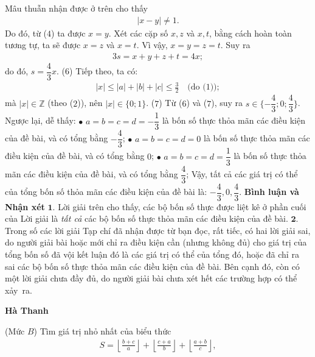 \begin{multicols}{2}
	\vskip 0.05cm
	Mâu thuẫn nhận được ở trên cho thấy
	\begin{align*}
		|x - y| \ne 1.
	\end{align*}
	Do đó, từ ($4$) ta được $x = y$.
	\vskip 0.05cm
	Xét các cặp số $x, z$ và $x, t$, bằng cách hoàn toàn tương tự, ta sẽ được $x = z$ và $x = t$.
	\vskip 0.05cm
	Vì vậy, $x = y = z = t$. Suy ra
	\begin{align*}
		3s = x  + y + z + t = 4x;
	\end{align*}
	do đó, $s = \dfrac{4}{3}x$. \hfill ($6$)
	\vskip 0.05cm
	Tiếp theo, ta có:
	\begin{align*}
		|x| \le |a| + |b| + |c| \le \frac{3}{2} \quad\text{(do ($1$))}; 
	\end{align*}
	mà $|x| \in \mathbb{Z}$  (theo ($2$)), nên  $|x| \in \{0;1\}$. \hfill ($7$)
	\vskip 0.05cm
	Từ ($6$) và ($7$), suy ra $s \in \{-\dfrac{4}{3}; 0; \dfrac{4}{3}\}$.
	\vskip 0.05cm 
	Ngược lại, dễ thấy:
	\vskip 0.05cm
	$\bullet$ $a=b=c=d = -\dfrac{1}{3}$   là bốn số thực thỏa mãn các điều kiện của đề bài, và có tổng bằng $- \dfrac{4}{3}$;
	\vskip 0.05cm  
	$\bullet$  $a=b=c=d = 0$  là bốn số thực thỏa mãn các điều kiện của đề bài, và có tổng bằng $0$;
	\vskip 0.05cm
	$\bullet$ $a=b=c=d = \dfrac{1}{3}$   là bốn số thực thỏa mãn các điều kiện của đề bài, và có tổng bằng $\dfrac{4}{3}$;
	\vskip 0.05cm  
	Vậy, tất cả các giá trị có thể của tổng bốn số thỏa mãn các điều kiện của đề bài là:  $- \dfrac{4}{3}, 0, \dfrac{4}{3}$.
	\vskip 0.05cm  
	\textbf{\color{thachthuctoanhoc}Bình luận và Nhận xét}
	\vskip 0.05cm
	$\pmb{1.}$ Lời giải trên cho thấy, các bộ bốn số thực được liệt kê ở phần cuối của Lời giải là \textit{tất cả} các bộ bốn số thực thỏa mãn các điều kiện của đề bài.
	\vskip 0.05cm
	$\pmb{2.}$ Trong số các lời giải Tạp chí đã nhận được từ bạn đọc, rất tiếc, có hai lời giải sai, do người giải bài hoặc mới chỉ ra điều kiện cần (nhưng không đủ) cho giá trị của tổng bốn số đã vội kết luận đó là các giá trị có thể của tổng đó, hoặc đã chỉ ra sai các bộ bốn số thực thỏa mãn các điều kiện của đề bài. Bên cạnh đó, còn có một lời giải chưa đầy đủ, do người giải bài chưa xét hết các trường hợp có thể xảy~ra.
	\begin{flushright}
		\textbf{\color{thachthuctoanhoc}Hà Thanh}
	\end{flushright}
	{}
	(Mức $B$)
	Tìm giá trị nhỏ nhất của biểu thức
	\begin{align*}
		S = \left\lfloor {\frac{{b + c}}{a}} \right\rfloor  + \left\lfloor {\frac{{c + a}}{b}} \right\rfloor  + \left\lfloor {\frac{{a + b}}{c}} \right\rfloor ,

\end{align*}
\end{multicols}
